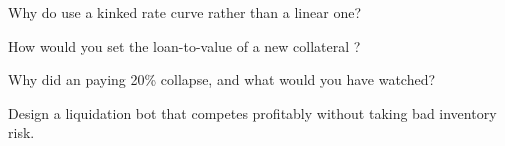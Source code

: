\begin{interviewq}\label{iq:m3:defi-credit-and-leverage:3}
Why do  use a kinked rate curve rather than a linear one?
\end{interviewq}

\begin{interviewq}\label{iq:m3:defi-credit-and-leverage:4}
How would you set the loan-to-value of a new collateral ?
\end{interviewq}

\begin{interviewq}\label{iq:m3:defi-credit-and-leverage:5}
Why did an  paying 20\% collapse, and what would you have watched?
\end{interviewq}

\begin{interviewq}\label{iq:m3:defi-credit-and-leverage:6}
Design a liquidation bot that competes profitably without taking bad inventory risk.
\end{interviewq}
